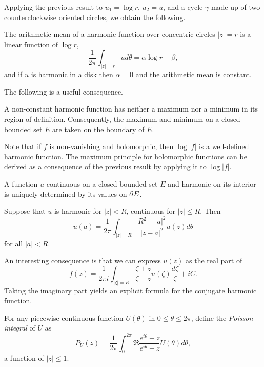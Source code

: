 Applying the previous result to $u_1 = \log r$, $u_2 = u$, and a cycle $\gamma$ made up of two counterclockwise oriented circles, we obtain the following.

\begin{theorem}
  The arithmetic mean of a harmonic function over concentric circles $|z| = r$ is a linear function of $\log r$,
  \[
  \frac{1}{2\pi} \int_{|z|=r} u d\theta = \alpha \log r + \beta,
  \]
  and if $u$ is harmonic in a disk then $\alpha = 0$ and the arithmetic mean is constant.
\end{theorem}

The following is a useful consequence.

\begin{theorem}
  A non-constant harmonic function has neither a maximum nor a minimum in its region of definition. Consequently, the maximum and minimum on a closed bounded set $E$ are taken on the boundary of $E$.
\end{theorem}

Note that if $f$ is non-vanishing and holomorphic, then $\log|f|$ is a well-defined harmonic function. The maximum principle for holomorphic functions can be derived as a consequence of the previous result by applying it to $\log|f|$.

\begin{corollary}
  A function $u$ continuous on a closed bounded set $E$ and harmonic on its interior is uniquely determined by its values on $\partial E$.
\end{corollary}

\begin{theorem}
  Suppose that $u$ is harmonic for $|z| < R$, continuous for $|z| \leq R$. Then
  \[
  u(a) = \frac{1}{2\pi} \int_{|z|=R} \frac{R^2-|a|^2}{|z-a|^2} u(z) d\theta
  \]
  for all $|a| < R$.
\end{theorem}

An interesting consequence is that we can express $u(z)$ as the real part of
\[
f(z) = \frac{1}{2 \pi i} \int_{|\zeta|=R} \frac{\zeta+z}{\zeta-z} u(\zeta) \frac{d\zeta}{\zeta} + i C.
\]
Taking the imaginary part yields an explicit formula for the conjugate harmonic function.

\begin{definition}
  For any piecewise continuous function $U(\theta)$ in $0 \leq \theta \leq 2\pi$, define the \emph{Poisson integral} of $U$ as
  \[
  P_U(z) = \frac{1}{2\pi} \int_0^{2\pi} \Re \frac{e^{i\theta}+z}{e^{i\theta}-z} U(\theta) d\theta,
  \]
  a function of $|z| \leq 1$.
\end{definition}

